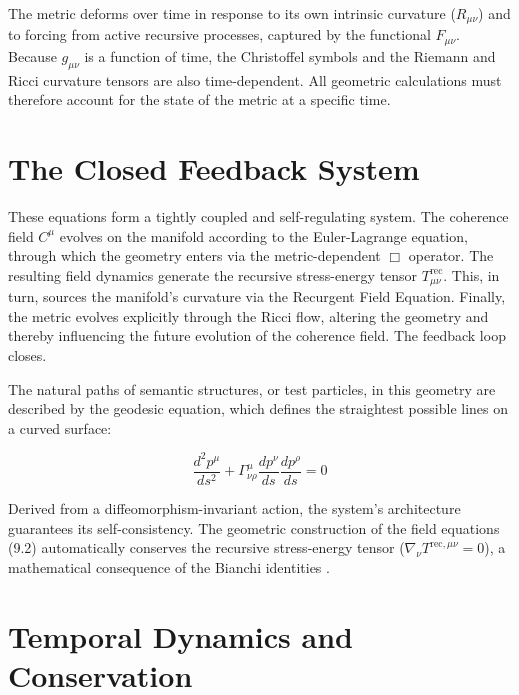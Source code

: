 The metric deforms over time in response to its own intrinsic curvature (\(R_{\mu\nu}\)) and to forcing from active recursive processes, captured by the functional \(F_{\mu\nu}\). Because \(g_{\mu\nu}\) is a function of time, the Christoffel symbols and the Riemann and Ricci curvature tensors are also time-dependent. All geometric calculations must therefore account for the state of the metric at a specific time.


\section{The Closed Feedback System}
\label{10.4:the_closed_feedback_system}

These equations form a tightly coupled and self-regulating system. The coherence field \(C^\mu\) evolves on the manifold according to the Euler-Lagrange equation, through which the geometry enters via the metric-dependent \(\Box\) operator. The resulting field dynamics generate the recursive stress-energy tensor \(T^{\text{rec}}_{\mu\nu}\). This, in turn, sources the manifold's curvature via the Recurgent Field Equation. Finally, the metric evolves explicitly through the Ricci flow, altering the geometry and thereby influencing the future evolution of the coherence field. The feedback loop closes.

The natural paths of semantic structures, or test particles, in this geometry are described by the geodesic equation, which defines the straightest possible lines on a curved surface:

\begin{equation}
\frac{d^2 p^\mu}{ds^2} + \Gamma^\mu_{\nu\rho} \frac{dp^\nu}{ds} \frac{dp^\rho}{ds} = 0
\end{equation}

Derived from a diffeomorphism-invariant action, the system's architecture guarantees its self-consistency. The geometric construction of the field equations (9.2) automatically conserves the recursive stress-energy tensor ($\nabla_\nu T^{\text{rec},\mu\nu} = 0$), a mathematical consequence of the Bianchi identities \autocite{Bianchi1894}.


\section{Temporal Dynamics and Conservation}
\label{10.5:temporal_dynamics_and_conservation}

